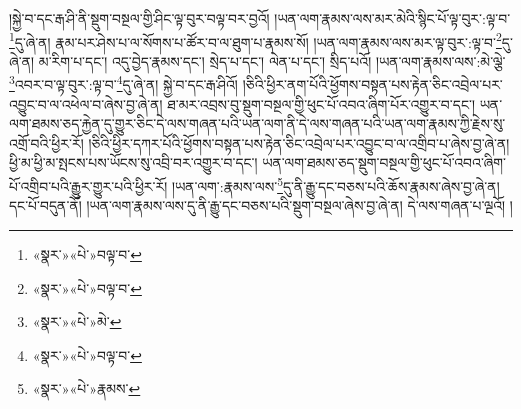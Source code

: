 །སྐྱེ་བ་དང་རྒ་ཤི་ནི་སྡུག་བསྔལ་གྱི་ཤིང་ལྟ་བུར་བལྟ་བར་བྱའོ། །ཡན་ལག་རྣམས་ལས་མར་མེའི་སྙིང་པོ་ལྟ་བུར་:ལྟ་བ་\footnote{«སྣར་»«པེ་»བལྟ་བ་}དུ་ཞེ་ན། རྣམ་པར་ཤེས་པ་ལ་སོགས་པ་ཚོར་བ་ལ་ཐུག་པ་རྣམས་སོ། །ཡན་ལག་རྣམས་ལས་མར་ལྟ་བུར་:ལྟ་བ་\footnote{«སྣར་»«པེ་»བལྟ་བ་}དུ་ཞེ་ན། མ་རིག་པ་དང་། འདུ་བྱེད་རྣམས་དང་། སྲེད་པ་དང་། ལེན་པ་དང་། སྲིད་པའོ། །ཡན་ལག་རྣམས་ལས་:མེ་ལྕེ་\footnote{«སྣར་»«པེ་»མེ་}འབར་བ་ལྟ་བུར་:ལྟ་བ་\footnote{«སྣར་»«པེ་»བལྟ་བ་}དུ་ཞེ་ན། སྐྱེ་བ་དང་རྒ་ཤིའོ། །ཅིའི་ཕྱིར་ནག་པོའི་ཕྱོགས་བསྟན་པས་རྟེན་ཅིང་འབྲེལ་པར་འབྱུང་བ་ལ་འཕེལ་བ་ཞེས་བྱ་ཞེ་ན། ཐ་མར་འབྲས་བུ་སྡུག་བསྔལ་གྱི་ཕུང་པོ་འབའ་ཞིག་པོར་འགྱུར་བ་དང་། ཡན་ལག་ཐམས་ཅད་རྐྱེན་དུ་གྱུར་ཅིང་དེ་ལས་གཞན་པའི་ཡན་ལག་ནི་དེ་ལས་གཞན་པའི་ཡན་ལག་རྣམས་ཀྱི་རྗེས་སུ་འགྲོ་བའི་ཕྱིར་རོ། །ཅིའི་ཕྱིར་དཀར་པོའི་ཕྱོགས་བསྟན་པས་རྟེན་ཅིང་འབྲེལ་པར་འབྱུང་བ་ལ་འགྲིབ་པ་ཞེས་བྱ་ཞེ་ན། ཕྱི་མ་ཕྱི་མ་སྤངས་པས་ཡོངས་སུ་འབྲི་བར་འགྱུར་བ་དང་། ཡན་ལག་ཐམས་ཅད་སྡུག་བསྔལ་གྱི་ཕུང་པོ་འབའ་ཞིག་པོ་འགྲིབ་པའི་རྒྱུར་གྱུར་པའི་ཕྱིར་རོ། །ཡན་ལག་:རྣམས་ལས་\footnote{«སྣར་»«པེ་»རྣམས་}དུ་ནི་རྒྱུ་དང་བཅས་པའི་ཆོས་རྣམས་ཞེས་བྱ་ཞེ་ན། དང་པོ་བདུན་ནོ། །ཡན་ལག་རྣམས་ལས་དུ་ནི་རྒྱུ་དང་བཅས་པའི་སྡུག་བསྔལ་ཞེས་བྱ་ཞེ་ན། དེ་ལས་གཞན་པ་ལྔའོ། །
